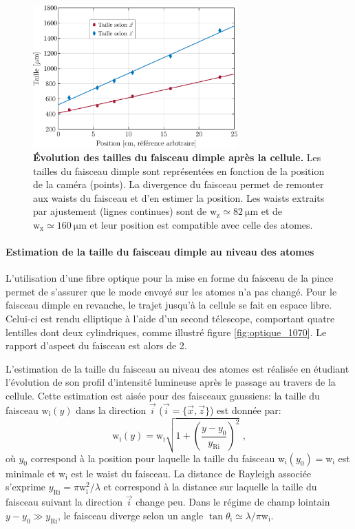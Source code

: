 \begin{figure}
\centering
\includegraphics[width=0.7\textwidth]{Fig/Modif_exp/expansion_dimple.pdf}
\caption{\textbf{Évolution des tailles du faisceau dimple après la cellule.} Les tailles du faisceau dimple sont représentées en fonction de la position de la caméra (points). La divergence du faisceau permet de remonter aux waists du faisceau et d'en estimer la position. Les waists extraits par ajustement (lignes continues) sont de $\mathrm{w_z}\simeq \SI{82}{\micro\metre}$ et de $\mathrm{w_x}\simeq \SI{160}{\micro\metre}$ et leur position est compatible avec celle des atomes.}
\label{fig:taille_dimple}
\end{figure}

\paragraph*{Estimation de la taille du faisceau dimple au niveau des atomes}
L'utilisation d'une fibre optique pour la mise en forme du faisceau de la pince permet de s'assurer que le mode envoyé sur les atomes n'a pas changé. Pour le faisceau dimple en revanche, le trajet jusqu'à la cellule se fait en espace libre. Celui-ci est rendu elliptique à l'aide d'un second télescope, comportant quatre lentilles dont deux cylindriques, comme illustré figure \ref{fig:optique_1070}. Le rapport d'aspect du faisceau est alors de 2. 




L'estimation de la taille du faisceau au niveau des atomes est réalisée en étudiant l'évolution de son profil d'intensité lumineuse après le passage au travers de la cellule. 
Cette estimation est aisée pour des faisceaux gaussiens: la taille du faisceau $\mathrm{w}_{\mathrm{i}}(y)$ dans la direction $\vec{i}$ ($\vec{i}= \lbrace \vec{x},\vec{z} \rbrace$) est donnée par:
\begin{equation}
\mathrm{w}_{\mathrm{i}}(y)=\mathrm{w}_{\mathrm{i}} \sqrt{1+\left( \frac{y-y_0}{y_{\mathrm{Ri}}} \right)^2} \text{ ,}
\label{eq:taille_faisceau}
\end{equation}
où $y_0$ correspond à la position pour laquelle la taille du faisceau $\mathrm{w}_{\mathrm{i}}(y_0)=\mathrm{w}_{\mathrm{i}}$ est minimale et $\mathrm{w}_{\mathrm{i}}$ est le waist du faisceau. La distance de Rayleigh associée s'exprime $y_{\mathrm{Ri}}=\pi \mathrm{w}_{\mathrm{i}}^2 / \lambda$ et correspond à la distance sur laquelle la taille du faisceau suivant la direction $\vec{i}$ change peu. Dans le régime de champ lointain $y-y_0 \gg y_{\mathrm{Ri}}$, le faisceau diverge selon un angle $\tan \theta_{\mathrm{i}} \simeq \lambda / \pi \mathrm{w}_{\mathrm{i}}$.

